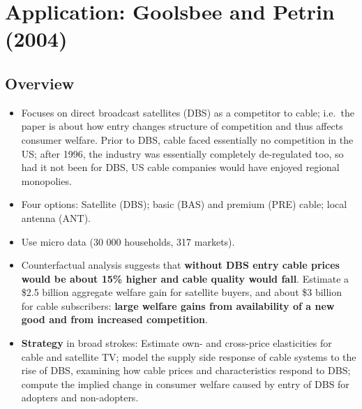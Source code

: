 \documentclass[11pt]{article}
\begin{document}
\section{Application: Goolsbee and Petrin (2004)}

	\subsection{Overview}
	\begin{itemize}
		\item Focuses on direct broadcast satellites (DBS) as a competitor to cable; i.e.\ the paper is about how entry changes structure of competition and thus affects consumer welfare. Prior to DBS, cable faced essentially no competition in the US; after 1996, the industry was essentially completely de-regulated too, so had it not been for DBS, US cable companies would have enjoyed regional monopolies.
		\item Four options: Satellite (DBS); basic (BAS) and premium (PRE) cable; local antenna (ANT).
		\item Use micro data (30 000 households, 317 markets).
			\item Counterfactual analysis suggests that \textbf{without DBS entry cable prices would be about 15\% higher and cable quality would fall}. Estimate a \$2.5 billion aggregate welfare gain for satellite buyers, and about \$3 billion for cable subscribers: \textbf{large welfare gains from availability of a new good and from increased competition}.
		\item \textbf{Strategy} in broad strokes: Estimate own- and cross-price elasticities for cable and satellite TV; model the supply side response of cable systems to the rise of DBS, examining how cable prices and characteristics respond to DBS; compute the implied change in consumer welfare caused by entry of DBS for adopters and non-adopters.
	\end{itemize}
\end{document}
